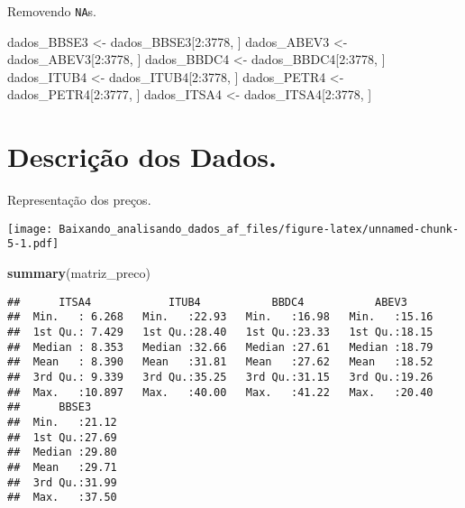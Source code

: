 \documentclass[]{article}
\newenvironment{Shaded}{\begin{snugshade}}{\end{snugshade}}
\newcommand{\KeywordTok}[1]{\textcolor[rgb]{0.13,0.29,0.53}{\textbf{{#1}}}}
\newcommand{\DataTypeTok}[1]{\textcolor[rgb]{0.13,0.29,0.53}{{#1}}}
\newcommand{\DecValTok}[1]{\textcolor[rgb]{0.00,0.00,0.81}{{#1}}}
\newcommand{\StringTok}[1]{\textcolor[rgb]{0.31,0.60,0.02}{{#1}}}
\newcommand{\NormalTok}[1]{{#1}}
\begin{document}
Removendo \texttt{NA}s.

\begin{Shaded}
\begin{Highlighting}[]
\NormalTok{dados_BBSE3 <-}\StringTok{ }\NormalTok{dados_BBSE3[}\DecValTok{2}\NormalTok{:}\DecValTok{3778}\NormalTok{, ]}
\NormalTok{dados_ABEV3 <-}\StringTok{ }\NormalTok{dados_ABEV3[}\DecValTok{2}\NormalTok{:}\DecValTok{3778}\NormalTok{, ]}
\NormalTok{dados_BBDC4 <-}\StringTok{ }\NormalTok{dados_BBDC4[}\DecValTok{2}\NormalTok{:}\DecValTok{3778}\NormalTok{, ]}
\NormalTok{dados_ITUB4 <-}\StringTok{ }\NormalTok{dados_ITUB4[}\DecValTok{2}\NormalTok{:}\DecValTok{3778}\NormalTok{, ]}
\NormalTok{dados_PETR4 <-}\StringTok{ }\NormalTok{dados_PETR4[}\DecValTok{2}\NormalTok{:}\DecValTok{3777}\NormalTok{, ]}
\NormalTok{dados_ITSA4 <-}\StringTok{ }\NormalTok{dados_ITSA4[}\DecValTok{2}\NormalTok{:}\DecValTok{3778}\NormalTok{, ]}
\end{Highlighting}
\end{Shaded}

\section{Descrição dos Dados.}\label{descricao-dos-dados.}

Representação dos preços.

\begin{Shaded}
\end{Shaded}

\texttt{[image: Baixando\_analisando\_dados\_af\_files/figure-latex/unnamed-chunk-5-1.pdf]}

\begin{Shaded}
\begin{Highlighting}[]
\KeywordTok{summary}\NormalTok{(matriz_preco)}
\end{Highlighting}
\end{Shaded}

\begin{verbatim}
##      ITSA4            ITUB4           BBDC4           ABEV3      
##  Min.   : 6.268   Min.   :22.93   Min.   :16.98   Min.   :15.16  
##  1st Qu.: 7.429   1st Qu.:28.40   1st Qu.:23.33   1st Qu.:18.15  
##  Median : 8.353   Median :32.66   Median :27.61   Median :18.79  
##  Mean   : 8.390   Mean   :31.81   Mean   :27.62   Mean   :18.52  
##  3rd Qu.: 9.339   3rd Qu.:35.25   3rd Qu.:31.15   3rd Qu.:19.26  
##  Max.   :10.897   Max.   :40.00   Max.   :41.22   Max.   :20.40  
##      BBSE3      
##  Min.   :21.12  
##  1st Qu.:27.69  
##  Median :29.80  
##  Mean   :29.71  
##  3rd Qu.:31.99  
##  Max.   :37.50
\end{verbatim}
\end{document}

